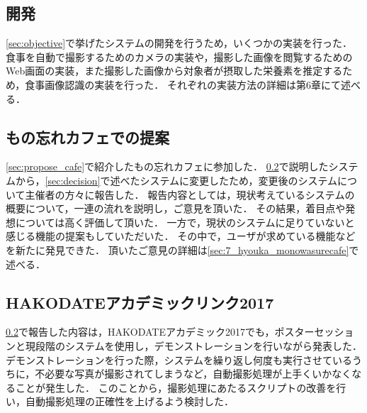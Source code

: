 \documentclass[../report]{subfiles}
\begin{document}
\subsection{開発}
\ref{sec:objective}で挙げたシステムの開発を行うため，いくつかの実装を行った．
食事を自動で撮影するためのカメラの実装や，撮影した画像を閲覧するためのWeb画面の実装，また撮影した画像から対象者が摂取した栄養素を推定するため，食事画像認識の実装を行った．
それぞれの実装方法の詳細は第6章にて述べる．

\subsection{もの忘れカフェでの提案} \label{sec:propose_cafe2}
\ref{sec:propose_cafe}で紹介したもの忘れカフェに参加した．
\ref{sec:propose_cafe2}で説明したシステムから，\ref{sec:decision}で述べたシステムに変更したため，変更後のシステムについて主催者の方々に報告した．
報告内容としては，現状考えているシステムの概要について，一連の流れを説明し，ご意見を頂いた．
その結果，着目点や発想については高く評価して頂いた．
一方で，現状のシステムに足りていないと感じる機能の提案もしていただいた．
その中で，ユーザが求めている機能などを新たに発見できた．
頂いたご意見の詳細は\ref{sec:7_hyouka_monowasurecafe}で述べる．

\subsection{HAKODATEアカデミックリンク2017}
\ref{sec:propose_cafe2}で報告した内容は，HAKODATEアカデミック2017でも，ポスターセッションと現段階のシステムを使用し，デモンストレーションを行いながら発表した．
デモンストレーションを行った際，システムを繰り返し何度も実行させているうちに，不必要な写真が撮影されてしまうなど，自動撮影処理が上手くいかなくなることが発生した．
このことから，撮影処理にあたるスクリプトの改善を行い，自動撮影処理の正確性を上げるよう検討した．
\end{document}
